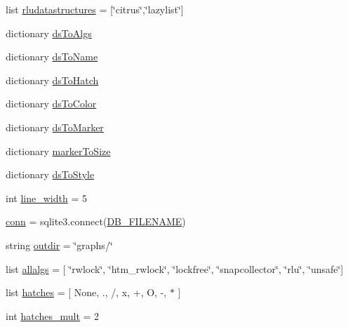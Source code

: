 \begin{DoxyCompactItemize}
\item 
list \hyperlink{namespacegraphs_a0352ccf80d3634541df2fa9e32641656}{rludatastructures} = \mbox{[}\char`\"{}citrus\char`\"{},\char`\"{}lazylist\char`\"{}\mbox{]}
\item 
dictionary \hyperlink{namespacegraphs_ad2e7ee345c905ffd361a1d15685eb4e2}{ds\+To\+Algs}
\item 
dictionary \hyperlink{namespacegraphs_a6af2e3b2f1a3b79bd2a458bbf83a7ff7}{ds\+To\+Name}
\item 
dictionary \hyperlink{namespacegraphs_a1145412cb5f02d21446dd3c6d1944f5c}{ds\+To\+Hatch}
\item 
dictionary \hyperlink{namespacegraphs_ac9d1b897f7ba900fa4347ea130716447}{ds\+To\+Color}
\item 
dictionary \hyperlink{namespacegraphs_a5c42405aa985130781ea9cad937fdf53}{ds\+To\+Marker}
\item 
dictionary \hyperlink{namespacegraphs_a311d9eae4590cc31845a23875aafa4f0}{marker\+To\+Size}
\item 
dictionary \hyperlink{namespacegraphs_a6ce3a98ae1dbb9201958249357fd9ac6}{ds\+To\+Style}
\item 
int \hyperlink{namespacegraphs_a325c6af7df764147d257f3b56c53c9a9}{line\+\_\+width} = 5
\item 
\hyperlink{namespacegraphs_a41999cb2012111866c70928779c3b637}{conn} = sqlite3.\+connect(\hyperlink{namespacegraphs_a9de39e4714ae5b26f7e89684b1024354}{D\+B\+\_\+\+F\+I\+L\+E\+N\+A\+ME})
\item 
string \hyperlink{namespacegraphs_a87f476415ca9e74c376ddfdea0c96685}{outdir} = \char`\"{}graphs/\char`\"{}
\item 
list \hyperlink{namespacegraphs_a2605aec886e87bd01743496674459c24}{allalgs} = \mbox{[} \char`\"{}rwlock\char`\"{}, \char`\"{}htm\+\_\+rwlock\char`\"{}, \char`\"{}lockfree\char`\"{}, \char`\"{}snapcollector\char`\"{}, \char`\"{}rlu\char`\"{}, \char`\"{}unsafe\char`\"{}\mbox{]}
\item 
list \hyperlink{namespacegraphs_a7834f87f73120010330fe10b311d2274}{hatches} = \mbox{[} None, \textquotesingle{}.\textquotesingle{}, \textquotesingle{}/\textquotesingle{}, \textquotesingle{}x\textquotesingle{}, \textquotesingle{}+\textquotesingle{}, \textquotesingle{}O\textquotesingle{}, \textquotesingle{}-\/\textquotesingle{}, \textquotesingle{}$\ast$\textquotesingle{} \mbox{]}
\item 
int \hyperlink{namespacegraphs_aff4f36c8185bf496f3f8674653eb94f7}{hatches\+\_\+mult} = 2
\item 

\end{DoxyCompactItemize}
